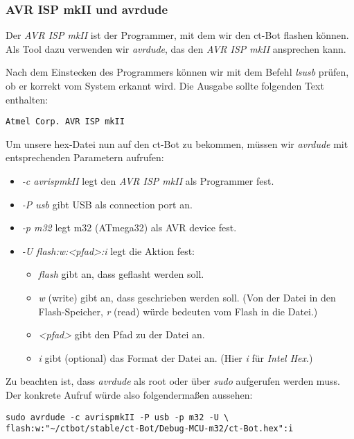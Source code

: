 \subsubsection{AVR ISP mkII und avrdude}
Der \textit{AVR ISP mkII} ist der Programmer, mit dem wir den ct-Bot flashen können. Als Tool dazu verwenden wir \textit{avrdude}, das den \textit{AVR ISP mkII} ansprechen kann.

Nach dem Einstecken des Programmers können wir mit dem Befehl \textit{lsusb} prüfen, ob er korrekt vom System erkannt wird. Die Ausgabe sollte folgenden Text enthalten:
\begin{lstlisting}
Atmel Corp. AVR ISP mkII
\end{lstlisting}

Um unsere hex-Datei nun auf den ct-Bot zu bekommen, müssen wir \textit{avrdude} mit entsprechenden Parametern aufrufen:
\begin{itemize}
\item \textit{-c avrispmkII} legt den \textit{AVR ISP mkII} als Programmer fest.
\item \textit{-P usb} gibt USB als connection port an.
\item \textit{-p m32} legt m32 (ATmega32) als AVR device fest.
\item \textit{-U flash:w:<pfad>:i} legt die Aktion fest:
	\begin{itemize}
	\item \textit{flash} gibt an, dass geflasht werden soll.
	\item \textit{w} (write) gibt an, dass geschrieben werden soll. (Von der Datei in den Flash-Speicher, \textit{r} (read) würde bedeuten vom Flash in die Datei.)
	\item \textit{<pfad>} gibt den Pfad zu der Datei an.
	\item \textit{i} gibt (optional) das Format der Datei an. (Hier \textit{i} für \textit{Intel Hex}.)
	\end{itemize}
\end{itemize}
Zu beachten ist, dass \textit{avrdude} als root oder über \textit{sudo} aufgerufen werden muss.
Der konkrete Aufruf würde also folgendermaßen aussehen:
\begin{lstlisting}
sudo avrdude -c avrispmkII -P usb -p m32 -U \
flash:w:"~/ctbot/stable/ct-Bot/Debug-MCU-m32/ct-Bot.hex":i
\end{lstlisting}
